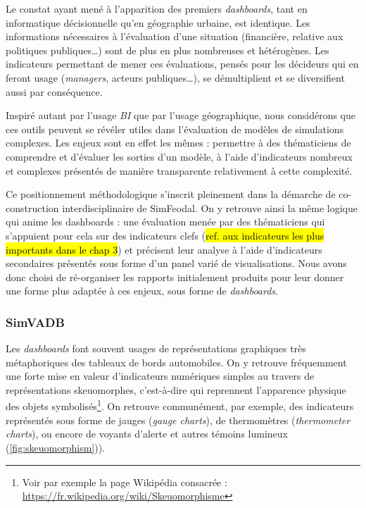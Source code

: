 Le constat ayant mené à l'apparition des premiers \textit{dashboards}, tant en informatique décisionnelle qu'en géographie urbaine, est identique.
Les informations nécessaires à l'évaluation d'une situation (financière, relative aux politiques publiques\ldots) sont de plus en plus nombreuses et hétérogènes.
Les indicateurs permettant de mener ces évaluations, pensés pour les décideurs qui en feront usage (\textit{managers}, acteurs publiques\ldots), se démultiplient et se diversifient aussi par conséquence.

Inspiré autant par l'usage \textit{BI} que par l'usage géographique, nous considérons que ces outils peuvent se révéler utiles dans l'évaluation de modèles de simulations complexes.
Les enjeux sont en effet les mêmes : permettre à des thématiciens de comprendre et d'évaluer les sorties d'un modèle, à l'aide d'indicateurs nombreux et complexes présentés de manière transparente relativement à cette complexité.

Ce positionnement méthodologique s'inscrit pleinement dans la démarche de co-construction interdisciplinaire de SimFeodal.
On y retrouve ainsi la même logique qui anime les dashboards : une évaluation menée par des thématiciens qui s'appuient pour cela sur des indicateurs clefs (\hl{ref. aux indicateurs les plus importants dans le chap 3}) et précisent leur analyse à l'aide d'indicateurs secondaires présentés sous forme d'un panel varié de visualisations.
Nous avons donc choisi de ré-organiser les rapports initialement produits pour leur donner une forme plus adaptée à ces enjeux, sous forme de \textit{dashboards}.

\subsubsection{SimVADB}\label{subsubsec:simvadb}

Les \textit{dashboards} font souvent usages de représentations graphiques très métaphoriques des tableaux de bords automobiles.
On y retrouve fréquemment une forte mise en valeur d'indicateurs numériques simples au travers de représentations \og skeuomorphes\fg{}, c'est-à-dire qui reprennent l'apparence physique des objets symbolisés\footnote{
	Voir par exemple la page Wikipédia consacrée : \href{https://fr.wikipedia.org/wiki/Skeuomorphisme}{https://fr.wikipedia.org/wiki/Skeuomorphisme}
}.
On retrouve communément, par exemple, des indicateurs représentés sous forme de jauges (\textit{gauge charts}), de thermomètres (\textit{thermometer charts}), ou encore de voyants d'alerte et autres témoins lumineux (\cref{fig:skeuomorphism})).


